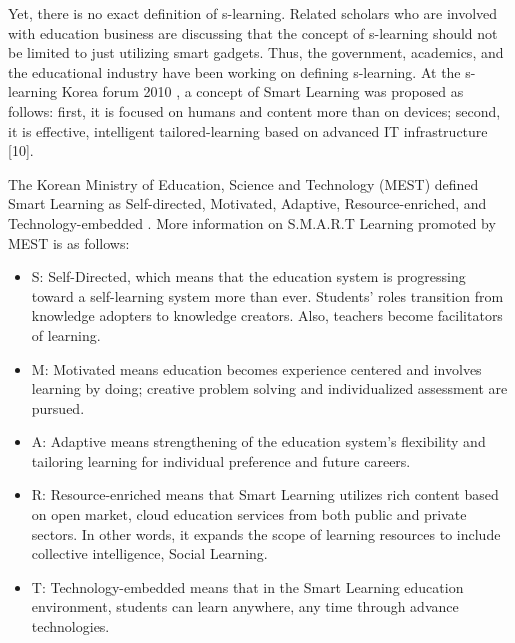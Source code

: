 \documentclass[journal]{vgtc}
\begin{document}
Yet, there is no exact definition of s-learning. Related scholars who are involved with education business are discussing that the concept of s-learning should not be limited to just utilizing smart gadgets. Thus, the government, academics, and the educational industry have been working on defining s-learning. At the s-learning Korea forum 2010 \cite{Kim2013a}, a concept of Smart Learning was proposed as follows: first, it is focused on humans and content more than on devices; second, it is effective, intelligent tailored-learning based on advanced IT infrastructure [10].

The Korean Ministry of Education, Science and Technology (MEST) defined Smart Learning as Self-directed, Motivated, Adaptive, Resource-enriched, and Technology-embedded \cite{mest}. More information on S.M.A.R.T Learning promoted by MEST is as follows:
\begin{itemize}
  \setlength\itemsep{-0.5em}
  \item S: Self-Directed, which means that the education system is progressing toward a self-learning system more than ever. Students' roles transition from knowledge adopters to knowledge creators. Also, teachers become facilitators of learning.
  \item M: Motivated means education becomes experience centered and involves learning by doing; creative problem solving and individualized assessment are pursued.
  \item A: Adaptive means strengthening of the education system's flexibility and tailoring learning for individual preference and future careers.
  \item R: Resource-enriched means that Smart Learning utilizes rich content based on open market, cloud education services from both public and private sectors. In other words, it expands the scope of learning resources to include collective intelligence, Social Learning.
  \item T: Technology-embedded means that in the Smart Learning education environment, students can learn anywhere, any time through advance technologies.
\end{itemize}
\end{document}
